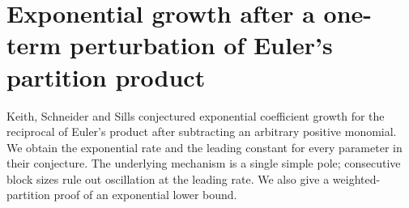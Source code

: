 \documentclass[11pt,a4paper]{article}
\numberwithin{equation}{section}
\theoremstyle{definition}
\theoremstyle{remark}
\newenvironment{sectionabstract}{\par\smallskip\begingroup\small\noindent}{\par\endgroup\medskip}
\begin{document}
\par\endgroup

\begingroup
\newcommand{\coeff}[1]{[z^{#1}]}
\section{\texorpdfstring{Exponential growth after a one-term perturbation of Euler's partition product}{Exponential growth after a one-term perturbation of Euler's partition product}}\label{section:r26taisho}
\par\medskip


\begin{sectionabstract}
Keith, Schneider and Sills conjectured exponential coefficient growth for
the reciprocal of Euler's product after subtracting an arbitrary positive
monomial. We obtain the exponential rate and the leading constant for
every parameter in their conjecture. The underlying mechanism is a single
simple pole; consecutive block sizes rule out oscillation at the leading
rate. We also give a weighted-partition proof of an exponential lower bound.
\end{sectionabstract}
\end{document}
